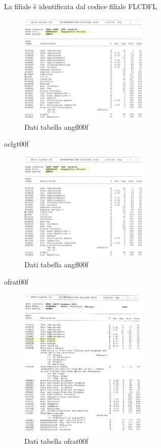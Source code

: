 \documentclass[target=bach,aauheader=,style=]{thud}
\begin{document}
La filiale è identificata dal codice filiale FLCDFL
\begin{figure}[H]
    \begin{center}
        \includegraphics[width=0.55\textwidth]{database/angfl00f.jpg}
    \end{center}
    \caption{Dati tabella angfl00f}
\end{figure}
oclgt00f 
\begin{figure}[H]
    \begin{center}
        \includegraphics[width=0.55\textwidth]{database/angfl00f.jpg}
    \end{center}
    \caption{Dati tabella angfl00f}
\end{figure}
ofrat00f
\begin{figure}[H]
    \begin{center}
        \includegraphics[width=0.55\textwidth]{database/ofrat00f.jpg}
    \end{center}
    \caption{Dati tabella ofrat00f}
\end{figure}
\end{document}
